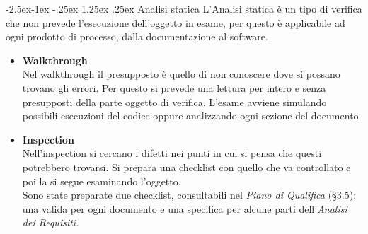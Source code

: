 \documentclass[a4paper,12pt]{article}
\makeatletter
\renewcommand\paragraph{\@startsection{paragraph}{4}{\z@}%
            {-2.5ex\@plus -1ex \@minus -.25ex}%
            {1.25ex \@plus .25ex}%
            {\normalfont\normalsize\bfseries}}
\makeatother
\begin{document}
            \paragraph{Analisi statica}
                L'Analisi statica è un tipo di verifica che non prevede l'esecuzione dell'oggetto in esame, per questo è applicabile ad ogni prodotto di processo, dalla documentazione al software.
                \begin{itemize}
                    \item \textbf{Walkthrough}\\
                        Nel walkthrough il presupposto è quello di non conoscere dove si possano trovano gli errori.
                        Per questo si prevede una lettura per intero e senza presupposti della parte oggetto di verifica.
                        L'esame avviene simulando possibili esecuzioni del codice oppure analizzando ogni sezione del documento.
                    \item \textbf{Inspection}\\
                        Nell'inspection si cercano i difetti nei punti in cui si pensa che questi potrebbero trovarsi.
                        Si prepara una checklist con quello che va controllato e poi la si segue esaminando l'oggetto.\\
                        Sono state preparate due checklist, consultabili nel \textit{Piano di Qualifica} (\S3.5): una valida per ogni documento e una specifica per alcune parti dell'\textit{Analisi dei Requisiti}.
                \end{itemize}
\end{document}

